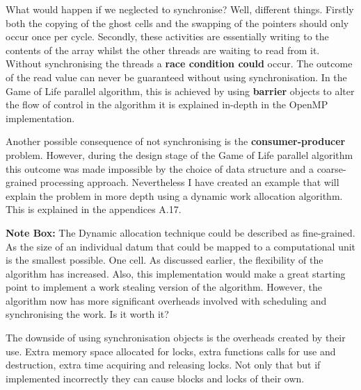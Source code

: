 \documentclass[11pt]{article} %
\begin{document}
What would happen if we neglected to synchronise? Well, different things. Firstly both the copying of the ghost cells and the swapping of the pointers should only occur once per cycle. Secondly, these activities are essentially writing to the contents of the array whilst the other threads are waiting to read from it. Without synchronising the threads a {\bf race condition could} occur. The outcome of the read value can never be guaranteed without using synchronisation. In the Game of Life parallel algorithm, this is achieved by using {\bf barrier} objects to alter the flow of control in the algorithm it is explained in-depth in the OpenMP implementation.

Another possible consequence of not synchronising is the {\bf consumer-producer} problem. However, during the design stage of the Game of Life parallel algorithm this outcome was made impossible by the choice of data structure and a coarse-grained processing approach. Nevertheless I have created an example that will explain the problem in more depth using a dynamic work allocation algorithm. \cite[p10]{ref13} This is explained in the appendices A.17.
\smallskip
\begin{mdframed}
{\bf Note Box: } The Dynamic allocation technique could be described as fine-grained. As the size of an individual datum that could be mapped to a computational unit is the smallest possible. One cell. As discussed earlier, the flexibility of the algorithm has increased. Also, this implementation would make a great starting point to implement a work stealing version of the algorithm. However, the algorithm now has more significant overheads involved with scheduling and synchronising the work. Is it worth it?
\end{mdframed}
\smallskip
The downside of using synchronisation objects is the overheads created by their use. Extra memory space allocated for locks, extra functions calls for use and destruction, extra time acquiring and releasing locks. Not only that but if implemented incorrectly they can cause blocks and locks of their own. \cite[Granularity]{ref15}
\end{document}
